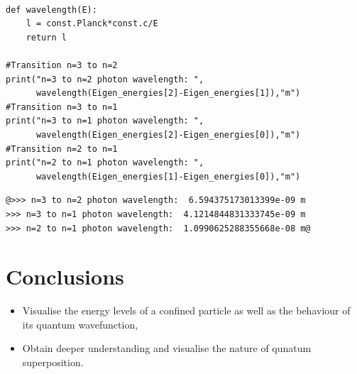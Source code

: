 \begin{listing}
\begin{verbatim}

def wavelength(E):
    l = const.Planck*const.c/E
    return l

#Transition n=3 to n=2
print("n=3 to n=2 photon wavelength: ", 
      wavelength(Eigen_energies[2]-Eigen_energies[1]),"m")
#Transition n=3 to n=1
print("n=3 to n=1 photon wavelength: ", 
      wavelength(Eigen_energies[2]-Eigen_energies[0]),"m")
#Transition n=2 to n=1
print("n=2 to n=1 photon wavelength: ", 
      wavelength(Eigen_energies[1]-Eigen_energies[0]),"m")
\end{verbatim}
\end{listing}

\begin{lstlisting}[frame=single,style=base,backgroundcolor=\color{black}]
@>>> n=3 to n=2 photon wavelength:  6.594375173013399e-09 m
>>> n=3 to n=1 photon wavelength:  4.1214844831333745e-09 m
>>> n=2 to n=1 photon wavelength:  1.0990625288355668e-08 m@
\end{lstlisting}


\section{Conclusions}

\begin{itemize}
    \item Visualise the energy levels of a confined particle as well as the behaviour of its quantum wavefunction,
    \item Obtain deeper understanding and visualise the nature of qunatum superposition.
\end{itemize}
